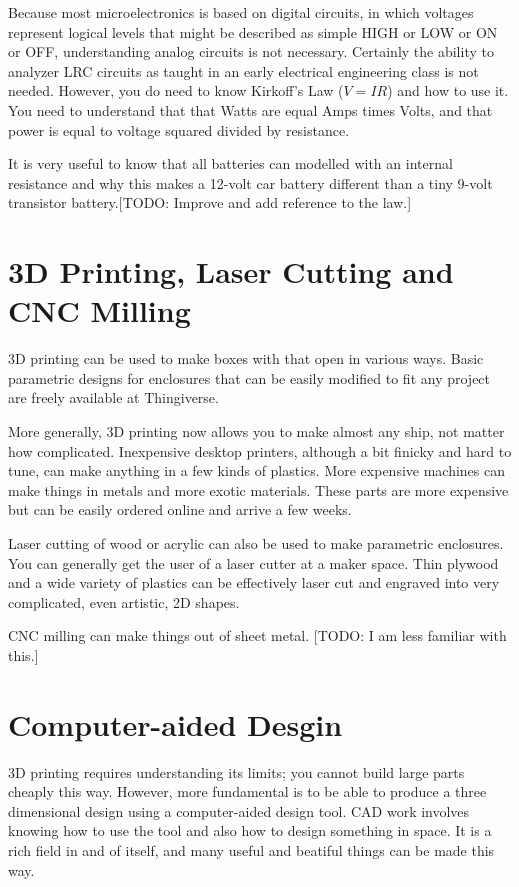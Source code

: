\documentclass[
	fontsize=10pt, %
	twoside=false, %
	secnumdepth=1, %
]{kaobook}
\begin{document}
Because most microelectronics is based on digital circuits,
in which voltages represent logical levels that might be
described as simple HIGH or LOW or ON or OFF, understanding
analog circuits is not necessary.
Certainly the ability to analyzer LRC circuits as taught
in an early electrical engineering class is not needed.
However, you do need to know Kirkoff's Law ($ V= IR$) and how to
use it. You need to understand that that Watts are equal
Amps times Volts, and that power is equal to voltage squared
divided by resistance.

It is very useful to know that all batteries can modelled
with an internal resistance and why this makes a 12-volt car battery
different than a tiny 9-volt transistor battery.[TODO: Improve and add reference to the law.]

\section{3D Printing, Laser Cutting and CNC Milling}

3D printing can be used to make boxes with that open in various
ways. Basic parametric designs for enclosures that can be
easily modified to fit any project are freely available at
Thingiverse.

More generally, 3D printing now allows you to make almost
any ship, not matter how complicated. Inexpensive desktop
printers, although a bit finicky and hard to tune, can
make anything in a few kinds of plastics. More expensive
machines can make things in metals and more exotic materials.
These parts are more expensive but can be easily ordered
online and arrive a few weeks.

Laser cutting of wood or acrylic can also be used to make
parametric enclosures.
You can generally get the user of a laser cutter at a
maker space. Thin plywood and a wide variety of plastics
can be effectively laser cut and engraved into very complicated,
even artistic, 2D shapes.

CNC milling can make things out of sheet metal. [TODO:
  I am less familiar with this.]

\section{Computer-aided Desgin}

3D printing requires understanding its limits; you
cannot build large parts cheaply this way.
However, more fundamental is to be able to produce a
three dimensional design using a computer-aided design
tool.
CAD work involves knowing how to use the tool and also
how to design something in space.
It is a rich field in and of itself, and
many useful and beatiful things can be made this way.
\end{document}
